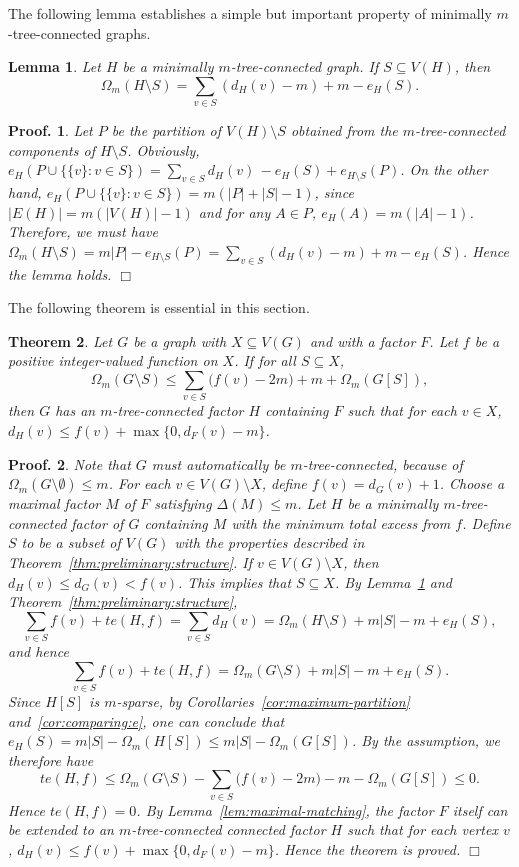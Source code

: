 \documentclass[10pt,bezier]{article}
\newtheorem{prethm}{{\bf Theorem}}[section]
\newenvironment{thm}{\begin{prethm}{\hspace{-0.5
em}{\bf.}}}{\end{prethm}}
\newtheorem{prelem}[prethm]{{\bf Lemma}}
\newenvironment{lem}{\begin{prelem}{\hspace{-0.5
em}{\bf.}}}{\end{prelem}}
\newtheorem{preproof}{{\bf Proof.}}
\newenvironment{proof}[1]{\begin{preproof}{\rm
#1}\hfill{$\Box$}}{\end{preproof}}
\begin{document}
%
The following lemma establishes a simple but important property of minimally $m$-tree-connected graphs.
%
\begin{lem}\label{lem:minimally,m-tree-connected}
{Let $H$ be a minimally $m$-tree-connected graph. If $ S\subseteq V(H)$, then
$$\Omega_m(H\setminus S)= \sum_{v\in S}(d_H(v)-m)+m-e_H(S).$$
}\end{lem}
%
\begin{proof}
{Let $P$ be the partition of $V(H)\setminus S$ obtained from the $m$-tree-connected components of $H\setminus S$.
Obviously, $e_H( P\cup \{\{v\}:v\in S\})=\sum_{v\in S}d_H(v)\,-e_H(S)+e_{H\setminus S}(P)$.
On the other hand, $e_H( P\cup \{\{v\}:v\in S\})=m(|P|+|S|-1)$, since
 $|E(H)|=m(|V(H)|-1)$ and for any $A\in P$, $e_H(A)= m(|A|-1)$.
Therefore, we must have
$\Omega_m(H\setminus S)=m|P|-e_{H\setminus S}(P)= \sum_{v\in S}(d_H(v)-m)+m-e_H(S)$. Hence the lemma holds.
}\end{proof}
%
The following theorem is essential in this section.
%
\begin{thm}\label{thm:sufficient}
Let $G$ be a graph with $X\subseteq V(G)$ and with a factor $F$. 
Let $f$ be a positive integer-valued function on $X$.
If for all $S\subseteq X$,
$$\Omega_m(G\setminus S)\le \sum_{v\in S}\big(f(v)-2m\big)+m+\Omega_m(G[ S]),$$
then $G$ has an $m$-tree-connected factor $H$ containing $F$ such that for each $v\in X$,
 $d_H(v)\le f(v)+\max\{0, d_F(v)-m\}$.
\end{thm}
%
\begin{proof}{Note that $G$ must automatically be $m$-tree-connected, because of $\Omega_m(G\setminus \emptyset) \le m$.
For each $v\in V(G)\setminus X$, define $f(v)=d_G(v)+1$. Choose a maximal factor $M$ of $F$ satisfying $\Delta(M)\le m$. 
Let $H$ be a minimally $m$-tree-connected factor of $G$ containing $M$ with the minimum total excess from $f$.
Define $S$ to be a subset of $V (G)$ with the properties described in Theorem~\ref{thm:preliminary:structure}.
If $v\in V(G)\setminus X$, then $d_{H}(v)\le d_G(v)<f(v)$. This implies that $S\subseteq X$.
%
By Lemma~\ref{lem:minimally,m-tree-connected} and Theorem~\ref{thm:preliminary:structure},
%
\begin{equation*}\label{main:eq:A:1}
\sum_{v\in S} f(v) +te(H,f)= \sum_{v\in S} d_H(v) = 
\Omega_m(H\setminus S)+m|S| -m+ e_{H}(S),
\end{equation*}
%
and hence
$$\sum_{v\in S} f(v) +te(H,f)= \Omega_m(G\setminus S)+m|S| -m+ e_{H}(S).
$$
%
Since $H[S]$ is $m$-sparse, by Corollaries~\ref{cor:maximum-partition} and~\ref{cor:comparing:e}, one can conclude that
$e_{H}(S) = m|S|-\Omega_m(H[S]) \le m|S|-\Omega_m(G[S])$.
By the assumption, we therefore have 
\begin{equation*}\label{main:eq:A:2}
te(H,f) \le \Omega_m(G\setminus S)- \sum_{v\in S}\big(f(v)-2m\big)-m-\Omega_m(G[S])\le 0.
\end{equation*}
%
Hence $te(H,f) = 0$. 
By Lemma~\ref{lem:maximal-matching}, the factor $F$ itself can be extended to an $m$-tree-connected connected factor $H$ 
such that for each vertex $v$,
$d_H(v)\le f(v)+\max\{0, d_F(v)-m\}$.
 Hence the theorem is proved.
}\end{proof}
\end{document}
